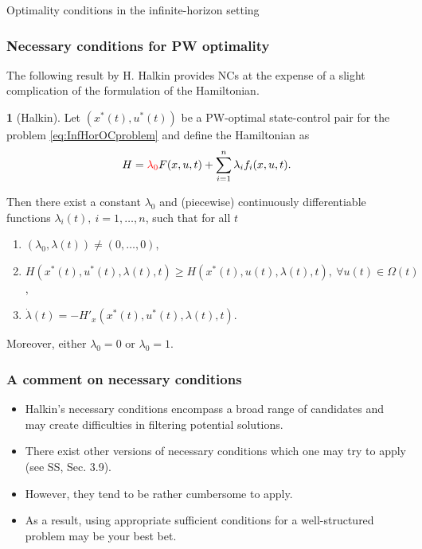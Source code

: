 \documentclass[10pt]{beamer}
\theoremstyle{definition}
\newtheorem{Fact}{\translate{Fact}}
\begin{document}
\begin{section}{Optimality conditions in the infinite-horizon setting}\label{sec:NCsSCs}

\begin{frame}[fragile]
\frametitle{Necessary conditions for PW optimality}
The following result by H. Halkin provides NCs at the expense of a slight complication of the formulation of the Hamiltonian.

\begin{Fact}[Halkin]
Let $ (x^*(t),u^*(t) ) $ be a PW-optimal state-control pair for the problem \eqref{eq:InfHorOCproblem} and define the Hamiltonian as \begin{equation}
H = \textcolor{red}{\lambda_0} F(x,u,t) + \sum_{i=1}^{n}\lambda_i f_i(x,u,t).
\label{eq:HamiltP0}
\end{equation}

Then there exist a constant $ \lambda_0 $ and (piecewise) continuously differentiable functions $ \lambda_i(t),~i=1,\ldots,n $, such that for all $ t $
\begin{enumerate}
\item $ (\lambda_0,\lambda(t)) \neq (0,\ldots,0)$,
\item $ H(x^*(t),u^*(t),\lambda(t),t )\geq H(x^*(t),u(t),\lambda(t),t ),~\forall u(t)\in \Omega(t) $,
\item $ \dot{\lambda}(t) = -H'_x(x^*(t),u^*(t),\lambda(t),t) $.
\end{enumerate}

Moreover, either $ \lambda_0=0 $ or $ \lambda_0=1 $.
\label{fc:HalkinNCs}
\end{Fact}
\end{frame}

\begin{frame}[fragile]
\frametitle{A comment on necessary conditions}
\begin{itemize}\itemsep1em
\item Halkin's necessary conditions encompass a broad range of candidates and may create difficulties in filtering potential solutions.
\item There exist other versions of necessary conditions which one may try to apply (see SS, Sec. 3.9).
\item However, they tend to be rather cumbersome to apply.
\item As a result, using appropriate sufficient conditions for a well-structured problem may be your best bet.
\end{itemize}
\end{frame}


\end{section}
\end{document}
